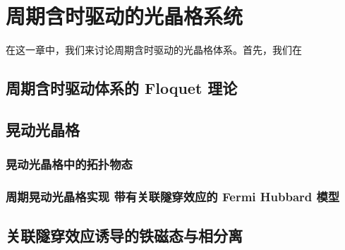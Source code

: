 \chapter{周期含时驱动的光晶格系统}

在这一章中，我们来讨论周期含时驱动的光晶格体系。首先，我们在


\section{周期含时驱动体系的 Floquet 理论} \label{sec:floqtheory}


\section{晃动光晶格}


\subsection{晃动光晶格中的拓扑物态}


\subsection{周期晃动光晶格实现 带有关联隧穿效应的 Fermi Hubbard 模型}


\section{关联隧穿效应诱导的铁磁态与相分离} \label{sec:floqhubb}